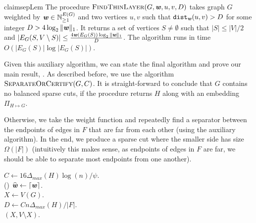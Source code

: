 \begin{restatable}{claim}{sepLem}\label{clm:thinLayer}
The procedure $\textsc{FindThinLayer}(G, \boldsymbol{{\mathit{w}}}, u, v, D)$ takes graph $G$ weighted by $\boldsymbol{{\mathit{w}}} \in \mathbb{N}_{\geq 1}^{E(G)}$ and two vertices $u,v$ such that $\operatorname{\mathtt{dist}}_{\boldsymbol{{\mathit{w}}}}(u,v) > D$ for some integer $D > 4 \log_2 \|\boldsymbol{{\mathit{w}}}\|_1$. It returns a set of vertices $S \neq \emptyset$ such that $|S| \leq |V|/2$ and $|E_G(S, V \setminus S)| \leq \frac{4  \boldsymbol{{\mathit{w}}}(E_G(S)) \log_2 \|\boldsymbol{{\mathit{w}}}\|_1 }{D}$. The algorithm runs in time $O(|E_G(S)| \log |E_G(S)|)$.
\end{restatable}

Given this auxiliary algorithm, we can state the final algorithm and prove our main result, . As described before, we use the algorithm $\textsc{SeparateOrCertify}(G, C)$. It is straight-forward to conclude that $G$ contains no balanced sparse cuts, if the procedure returns $H$ along with an embedding $\Pi_{H \mapsto G}$.

Otherwise, we take the weight function and repeatedly find a separator between the endpoints of edges in $F$ that are far from each other (using the auxiliary algorithm). In the end, we produce a sparse cut where the smaller side has size $\Omega(|F|)$ (intuitively this makes sense, as endpoints of edges in $F$ are far, we should be able to separate most endpoints from one another).

\begin{algorithm}
$C \gets 16 \Delta_{max}(H) \log(n)/\psi$.\\
\Else(){
    $\widehat{\boldsymbol{\mathit{w}}} \gets \lceil \boldsymbol{{\mathit{w}}} \rceil$. \\
    $X \gets V(G)$.\\
    $D \gets {C n \Delta_{max}(H)}/{|F|}$.\\
    \Return $(X, V \setminus X)$. \label{lne:returnSparseCut}
}
\caption{$\textsc{SparseCutOrCertify}(G, \psi, b)$}\label{alg:mainAlgo}
\end{algorithm}

\APSPreduction*

